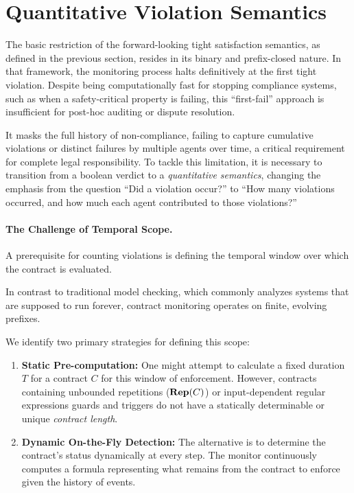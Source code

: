% 

\section{Quantitative Violation Semantics}

The basic restriction of the forward-looking tight satisfaction semantics, as defined in the previous section, resides in its binary and prefix-closed nature. In that framework, the monitoring process halts definitively at the first tight violation.
Despite being computationally fast for stopping compliance systems, such as when a safety-critical property is failing, this ``first-fail'' approach is insufficient for post-hoc auditing or dispute resolution.

It masks the full history of non-compliance, failing to capture cumulative violations or distinct failures by multiple agents over time, a critical requirement for complete legal responsibility.
To tackle this limitation, it is necessary to transition from a boolean verdict to a \emph{quantitative semantics}, changing the emphasis from the question ``Did a violation occur?'' to ``How many violations occurred, and how much each agent contributed to those violations?''





\paragraph{The Challenge of Temporal Scope.}

A prerequisite for counting violations is defining the temporal window over which the contract is evaluated.

In contrast to traditional model checking, which commonly analyzes systems that are supposed to run forever, contract monitoring operates on finite, evolving prefixes.

We identify two primary strategies for defining this scope:



\begin{enumerate}
    \item \textbf{Static Pre-computation:} One might attempt to calculate a fixed duration $T$ for a contract $C$ for this window of enforcement.
  However, contracts containing unbounded repetitions ($\mathbf{Rep}(C)$) or input-dependent regular expressions guards and triggers do not have a statically determinable or unique \emph{contract length}.
    \item \textbf{Dynamic On-the-Fly Detection:} The alternative is to determine the contract's status dynamically at every step. The monitor continuously computes a formula representing what remains from the contract to enforce given the history of events.
\end{enumerate}



